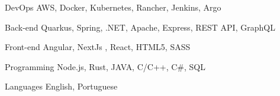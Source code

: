 

\begin{cvskills}

  \cvskill
    {DevOps} %
    {AWS, Docker, Kubernetes, Rancher, Jenkins, Argo} %

  \cvskill
    {Back-end} %
    {Quarkus, Spring, .NET, Apache, Express, REST API, GraphQL} %

  \cvskill
    {Front-end} %
    {Angular, NextJs , React, HTML5, SASS} %

  \cvskill
    {Programming} %
    {Node.js, Rust, JAVA, C/C++, C\#, SQL} %

  \cvskill
    {Languages} %
    {English, Portuguese} %

\end{cvskills}
